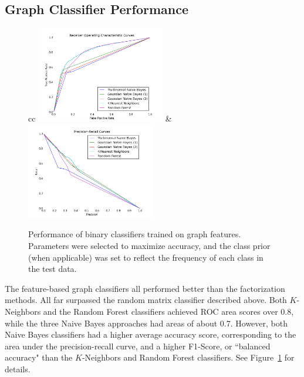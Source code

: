 \documentclass{article} %
\begin{document}
\subsection{Graph Classifier Performance}

\begin{figure}[!hbt]
\label{fig:classifiers}
\begin{tabular}{cc}
\includegraphics[width=0.5\textwidth]{figs/roc.png} &
\includegraphics[width=0.5\textwidth]{figs/prc.png} \\
\end{tabular}
\caption{Performance of binary classifiers trained on graph features.  Parameters were selected to maximize accuracy, and the class prior (when applicable) was set to reflect the frequency of each class in the test data.}
\end{figure}

The feature-based graph classifiers all performed better than the factorization methods.  All far surpassed the random matrix classifier described above.  Both $K$-Neighbors and the Random Forest classifiers achieved ROC area scores over 0.8, while the three Naive Bayes approaches had areas of about 0.7.  However, both Naive Bayes classifiers had a higher average accuracy score, corresponding to the area under the precision-recall curve, and a higher F1-Score, or ``balanced accuracy" than the $K$-Neighbors and Random Forest classifiers.  See Figure~\ref{fig:classifiers} for details.
\end{document}
